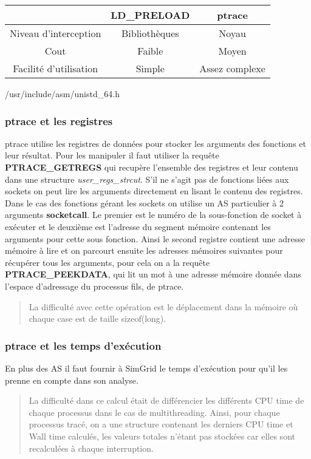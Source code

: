 \documentclass{article}
\begin{document}
\begin{tabular}{|c|c|c|}
\hline & LD\_PRELOAD & ptrace\\ \hline Niveau d'interception & Bibliothèques &
Noyau \\ \hline Cout & Faible & Moyen \\ \hline Facilité d'utilisation & Simple
& Assez complexe \\ \hline
\end{tabular}

/usr/include/asm/unistd\_64.h

\subsubsection{ptrace et les registres}
ptrace utilise les registres de données pour stocker les arguments des fonctions
et leur résultat. Pour les manipuler il faut utiliser la requête
\textbf{PTRACE\_GETREGS} qui recupère l'ensemble des registres et leur contenu
dans une structure \textit{user\_regs\_strcut}. S'il ne s'agit pas de fonctions
liées aux sockets on peut lire les arguments directement en lisant le contenu
des registres. Dans le cas des fonctions gérant les sockets on utilise un AS
particulier à 2 arguments \textbf{socketcall}. Le premier est le numéro de la
sous-fonction de socket à exécuter et le deuxième est l'adresse du segment
mémoire contenant les arguments pour cette sous fonction. Ainsi le second
registre contient une adresse mémoire à lire et on parcourt ensuite les adresses
mémoires suivantes pour récupérer tous les arguments, pour cela on a la requête
\textbf{PTRACE\_PEEKDATA}, qui lit un mot à une adresse mémoire donnée dans
l'espace d'adressage du processus fils, de ptrace.
\begin{quotation}
La difficulté avec cette opération est le déplacement dans la mémoire où chaque
case est de taille sizeof(long).
\end{quotation}

\subsubsection{ptrace et les temps d'exécution}
En plus des AS il faut fournir à SimGrid le temps d'exécution pour qu'il les
prenne en compte dans son analyse.
\begin{quotation}
La difficulté dans ce calcul était de différencier les différents CPU time de
chaque processus dans le cas de multithreading. Ainsi, pour chaque processus
tracé, on a une structure contenant les derniers CPU time et Wall time calculés,
les valeurs totales n’étant pas stockées car elles sont recalculées à chaque
interruption.
\end{quotation}
\end{document}
